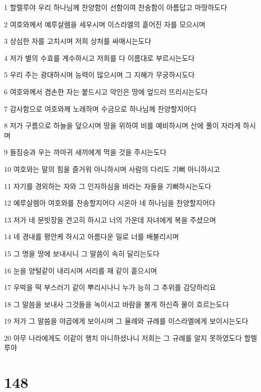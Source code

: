 \par 1 할렐루야 우리 하나님께 찬양함이 선함이여 찬송함이 아름답고 마땅하도다
\par 2 여호와께서 예루살렘을 세우시며 이스라엘의 흩어진 자를 모으시며
\par 3 상심한 자를 고치시며 저희 상처를 싸매시는도다
\par 4 저가 별의 수효를 계수하시고 저희를 다 이름대로 부르시는도다
\par 5 우리 주는 광대하시며 능력이 많으시며 그 지혜가 무궁하시도다
\par 6 여호와께서 겸손한 자는 붙드시고 악인은 땅에 엎드러 뜨리시는도다
\par 7 감사함으로 여호와께 노래하며 수금으로 하나님께 찬양할지어다
\par 8 저가 구름으로 하늘을 덮으시며 땅을 위하여 비를 예비하시며 산에 풀이 자라게 하시며
\par 9 들짐승과 우는 까마귀 새끼에게 먹을 것을 주시는도다
\par 10 여호와는 말의 힘을 즐거워 아니하시며 사람의 다리도 기뻐 아니하시고
\par 11 자기를 경외하는 자와 그 인자하심을 바라는 자들을 기뻐하시는도다
\par 12 예루살렘아 여호와를 찬송할지어다 시온아 네 하나님을 찬양할지어다
\par 13 저가 네 문빗장을 견고히 하시고 너의 가운데 자녀에게 복을 주셨으며
\par 14 네 경내를 평안케 하시고 아름다운 밀로 너를 배불리시며
\par 15 그 명을 땅에 보내시니 그 말씀이 속히 달리는도다
\par 16 눈을 양털같이 내리시며 서리를 재 같이 흩으시며
\par 17 우박을 떡 부스러기 같이 뿌리시나니 누가 능히 그 추위를 감당하리요
\par 18 그 말씀을 보내사 그것들을 녹이시고 바람을 불게 하신즉 물이 흐르는도다
\par 19 저가 그 말씀을 야곱에게 보이시며 그 율례와 규례를 이스라엘에게 보이시는도다
\par 20 아무 나라에게도 이같이 행치 아니하셨나니 저희는 그 규례를 알지 못하였도다 할렐루야

\chapter{148}

